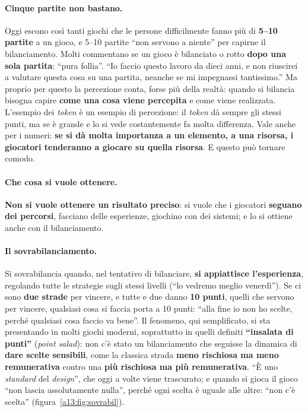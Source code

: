 \paragraph{Cinque partite non bastano.} Oggi escono così tanti giochi che le persone
difficilmente fanno più di \textbf{5--10 partite} a un gioco, e 5--10 partite ``non servono a
niente'' per capirne il bilanciamento. Molti commentano se un gioco è bilanciato o rotto
\textbf{dopo una sola partita}: ``pura follia''. ``Io faccio questo lavoro da dieci anni, e non
riuscirei a valutare questa cosa su una partita, neanche se mi impegnassi tantissimo.'' Ma
proprio per questo la percezione conta, forse più della realtà: quando si bilancia bisogna
capire \textbf{come una cosa viene percepita} e come viene realizzata. L'esempio dei
\emph{token} è un esempio di percezione: il \emph{token} dà sempre gli stessi punti, ma se è
grande e lo si vede costantemente fa molta differenza. Vale anche per i numeri:
\textbf{se si dà molta importanza a un elemento, a una risorsa, i giocatori tenderanno a
giocare su quella risorsa}. E questo può tornare comodo.

\paragraph{Che cosa si vuole ottenere.} \textbf{Non si vuole ottenere un risultato preciso}: si
vuole che i giocatori \textbf{seguano dei percorsi}, facciano delle esperienze, giochino con
dei sistemi; e lo si ottiene anche con il bilanciamento.

\paragraph{Il sovrabilanciamento.} Si sovrabilancia quando, nel tentativo di bilanciare,
\textbf{si appiattisce l'esperienza}, regolando tutte le strategie sugli stessi livelli (``lo
vedremo meglio venerdì''). Se ci sono \textbf{due strade} per vincere, e tutte e due danno
\textbf{10 punti}, quelli che servono per vincere, qualsiasi cosa si faccia porta a 10 punti:
``alla fine io non ho scelte, perché qualsiasi cosa faccio va bene''. Il fenomeno, qui
semplificato, si sta presentando in molti giochi moderni, soprattutto in quelli definiti
\textbf{``insalata di punti''} (\emph{point salad}): non c'è stato un bilanciamento che
seguisse la dinamica di \textbf{dare scelte sensibili}, come la classica strada \textbf{meno
rischiosa ma meno remunerativa} contro una \textbf{più rischiosa ma più remunerativa}. ``È uno
\emph{standard} del \emph{design}'', che oggi a volte viene trascurato; e quando si gioca il
gioco ``non lascia assolutamente nulla'', perché ogni scelta è uguale alle altre: ``non c'è
scelta'' (figura~\ref{a13:fig:sovrabil}).

